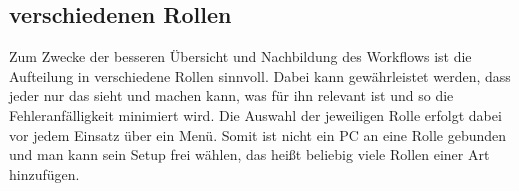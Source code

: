 \subsection{verschiedenen Rollen}
Zum Zwecke der besseren Übersicht und Nachbildung des Workflows ist die Aufteilung in verschiedene Rollen sinnvoll.  
Dabei kann gewährleistet werden, dass jeder nur das sieht und machen kann, was für ihn relevant ist und so die Fehleranfälligkeit minimiert wird. 
Die Auswahl der jeweiligen Rolle erfolgt dabei vor jedem Einsatz über ein Menü. Somit ist nicht ein PC an eine Rolle gebunden und man kann sein Setup frei wählen, das heißt beliebig viele Rollen einer Art hinzufügen.
